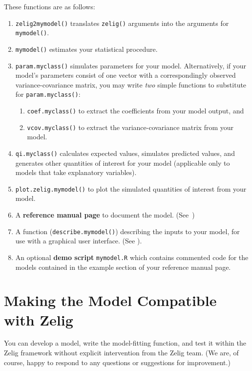 These functions are as follows:  
\begin{enumerate}
\item {\tt zelig2mymodel()} translates {\tt zelig()} arguments into
the arguments for {\tt mymodel()}.
\item {\tt mymodel()} estimates your statistical procedure.
\item {\tt param.myclass()} simulates parameters for your model.
Alternatively, if your model's parameters consist of one vector with a
correspondingly observed variance-covariance matrix, you may write
\emph{two} simple functions to substitute for {\tt param.myclass()}:  
\begin{enumerate}
\item {\tt coef.myclass()} to extract the coefficients from your model
output, and
\item {\tt vcov.myclass()} to extract the variance-covariance matrix
from your model.  
\end{enumerate}
\item {\tt qi.myclass()} calculates expected values, simulates
predicted values, and generates other quantities of interest for your
model (applicable only to models that take explanatory variables).  
\item {\tt plot.zelig.mymodel()} to plot the simulated quantities of
interest from your model.  
\item A {\bf reference manual page} to document the model.
  (See~)
\item A function ({\tt describe.mymodel()}) describing the inputs to
your model, for use with a graphical user interface.  (See ).  
\item An optional {\bf demo script} {\tt mymodel.R} which contains commented code for
  the models contained in the example section of your reference manual
  page.
\end{enumerate}

\section{Making the Model Compatible with Zelig}\label{compatible}

You can develop a model, write the model-fitting function, and test it
within the Zelig framework without explicit intervention from the
Zelig team.  (We are, of course, happy to respond to any questions or
suggestions for improvement.)  

